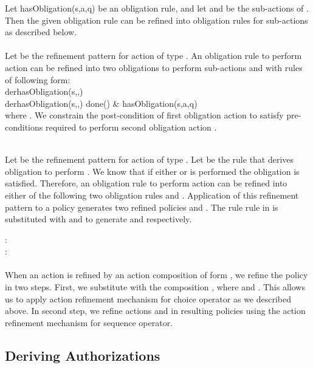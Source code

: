 \documentclass[12pt,journal,letterpaper,onecolumn]{IEEEtran}
\begin{document}
Let {\ttfamily hasObligation(s,a,q)} be an obligation rule, and let  and  be the
sub-actions of . Then the given
obligation rule can be
refined into obligation rules for sub-actions as described below. \\


\\ Let  be the refinement pattern for action of type
. An obligation rule to perform action  can be refined into
two obligations to perform sub-actions  and  with rules
of following form:\\
\noindent
{\ttfamily derhasObligation(s,,)}  \\
{\ttfamily derhasObligation(s,,)}  {\ttfamily done()  \& hasObligation(s,a,q)}\\
where . We constrain the post-condition
of first obligation action  to satisfy pre-conditions required
to perform second obligation action .



\\
Let  be the refinement pattern for action
of type . Let  be the rule that derives obligation to perform .
We know that if either  or  is performed the obligation
is satisfied. Therefore, an obligation rule to perform action 
can be refined into either of the following two obligation rules 
and . Application of this refinement pattern to a policy 
generates two refined policies  and . The rule
rule  in  is substituted with  and  to generate
 and  respectively.

\noindent
:   \\
: \\


\\
When an action  is refined by an action composition of form
, we refine the policy in two steps. First, we
substitute  with the composition ,
where  and .
This allows us to apply action refinement mechanism for choice operator
as we described above. In second step, we refine actions 
and  in resulting policies using the action refinement
mechanism for sequence operator.




\subsection{Deriving Authorizations}
\end{document}
